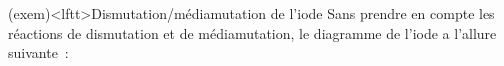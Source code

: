 \documentclass[../../main/main.tex]{subfiles}
\begin{document}
\begin{tcb*}[sidebyside, sidebyside align=top](exem)<lftt>{Dismutation/médiamutation de l'iode}
	Sans prendre en compte les réactions de dismutation et de médiamutation, le
	diagramme de l'iode a l'allure suivante~:
	\begin{center}
    \vspace{-15pt}
	\end{center}
	\tcblower

\end{tcb*}
\end{document}

